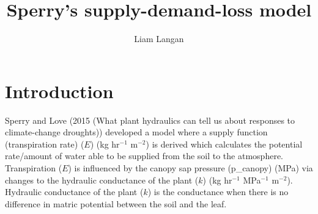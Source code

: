\documentclass[a4paper]{article}\usepackage[]{graphicx}\usepackage[]{color}
\begin{document}
\title{Sperry's supply-demand-loss model}
\author{Liam Langan}
\maketitle


\section{Introduction}
Sperry and Love (2015 (What plant hydraulics can tell us about responses to climate-change droughts)) developed a model where a supply function (transpiration rate) ($E$) (kg hr$^{-1}$ m$^{-2}$) is derived which calculates the potential rate/amount of water able to be supplied from the soil to the atmosphere. Transpiration ($E$) is influenced by the canopy sap pressure (p_canopy) (MPa) via changes to the hydraulic conductance of the plant ($k$) (kg hr$^{-1}$ MPa$^{-1}$ m$^{-2}$). Hydraulic conductance of the plant ($k$) is the conductance when there is no difference in matric potential between the soil and the leaf.  
\end{document}
